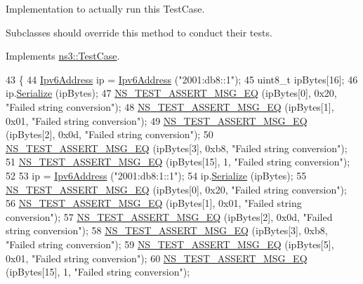 Implementation to actually run this Test\+Case. 

Subclasses should override this method to conduct their tests. 

Implements \hyperlink{classns3_1_1TestCase_a8ff74680cf017ed42011e4be51917a24}{ns3\+::\+Test\+Case}.


\begin{DoxyCode}
43 \{
44   \hyperlink{classns3_1_1Ipv6Address}{Ipv6Address} ip = \hyperlink{classns3_1_1Ipv6Address}{Ipv6Address} (\textcolor{stringliteral}{"2001:db8::1"});
45   uint8\_t ipBytes[16];
46   ip.\hyperlink{classns3_1_1Ipv6Address_adf5b453892de2893a371380ab299db88}{Serialize} (ipBytes);
47   \hyperlink{group__testing_ga2a9d78cffb3db8e867c35fff0b698cf5}{NS\_TEST\_ASSERT\_MSG\_EQ} (ipBytes[0], 0x20, \textcolor{stringliteral}{"Failed string conversion"});
48   \hyperlink{group__testing_ga2a9d78cffb3db8e867c35fff0b698cf5}{NS\_TEST\_ASSERT\_MSG\_EQ} (ipBytes[1], 0x01, \textcolor{stringliteral}{"Failed string conversion"});
49   \hyperlink{group__testing_ga2a9d78cffb3db8e867c35fff0b698cf5}{NS\_TEST\_ASSERT\_MSG\_EQ} (ipBytes[2], 0x0d, \textcolor{stringliteral}{"Failed string conversion"});
50   \hyperlink{group__testing_ga2a9d78cffb3db8e867c35fff0b698cf5}{NS\_TEST\_ASSERT\_MSG\_EQ} (ipBytes[3], 0xb8, \textcolor{stringliteral}{"Failed string conversion"});
51   \hyperlink{group__testing_ga2a9d78cffb3db8e867c35fff0b698cf5}{NS\_TEST\_ASSERT\_MSG\_EQ} (ipBytes[15], 1, \textcolor{stringliteral}{"Failed string conversion"});
52 
53   ip = \hyperlink{classns3_1_1Ipv6Address}{Ipv6Address} (\textcolor{stringliteral}{"2001:db8:1::1"});
54   ip.\hyperlink{classns3_1_1Ipv6Address_adf5b453892de2893a371380ab299db88}{Serialize} (ipBytes);
55   \hyperlink{group__testing_ga2a9d78cffb3db8e867c35fff0b698cf5}{NS\_TEST\_ASSERT\_MSG\_EQ} (ipBytes[0], 0x20, \textcolor{stringliteral}{"Failed string conversion"});
56   \hyperlink{group__testing_ga2a9d78cffb3db8e867c35fff0b698cf5}{NS\_TEST\_ASSERT\_MSG\_EQ} (ipBytes[1], 0x01, \textcolor{stringliteral}{"Failed string conversion"});
57   \hyperlink{group__testing_ga2a9d78cffb3db8e867c35fff0b698cf5}{NS\_TEST\_ASSERT\_MSG\_EQ} (ipBytes[2], 0x0d, \textcolor{stringliteral}{"Failed string conversion"});
58   \hyperlink{group__testing_ga2a9d78cffb3db8e867c35fff0b698cf5}{NS\_TEST\_ASSERT\_MSG\_EQ} (ipBytes[3], 0xb8, \textcolor{stringliteral}{"Failed string conversion"});
59   \hyperlink{group__testing_ga2a9d78cffb3db8e867c35fff0b698cf5}{NS\_TEST\_ASSERT\_MSG\_EQ} (ipBytes[5], 0x01, \textcolor{stringliteral}{"Failed string conversion"});
60   \hyperlink{group__testing_ga2a9d78cffb3db8e867c35fff0b698cf5}{NS\_TEST\_ASSERT\_MSG\_EQ} (ipBytes[15], 1, \textcolor{stringliteral}{"Failed string conversion"});

\end{DoxyCode}

